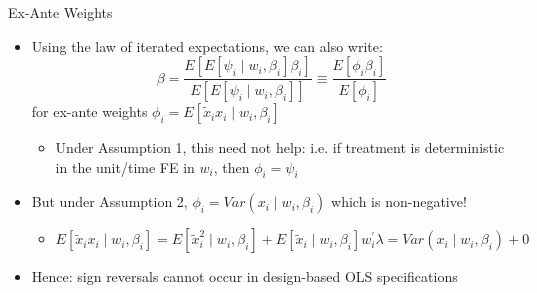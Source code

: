\documentclass[11pt,english]{beamer}
\begin{document}
\begin{frame}{Ex-Ante Weights}

\begin{itemize}
\item Using the law of iterated expectations, we can also write:
\begin{equation*}
\beta= \frac{E[E[\psi_i\mid w_i,\beta_i]\beta_i]}{E[E[\psi_i\mid w_i,\beta_i]]}\equiv \frac{E[\phi_i\beta_i]}{E[\phi_i]}
\end{equation*}
for ex-ante weights $\phi_i = E[\tilde{x}_ix_i\mid w_i,\beta_i]$
\pause{}\smallskip
\begin{itemize}
\item Under Assumption 1, this need not help: i.e. if treatment is deterministic in the unit/time FE in $w_i$, then $\phi_i=\psi_i$\pause{}
\end{itemize}\bigskip 

\item But under Assumption 2, $\phi_i=Var(x_i\mid w_i,\beta_i)$ which is non-negative!\smallskip\pause{}
\begin{itemize}
\item $E[\tilde{x}_ix_i\mid w_i,\beta_i]=E[\tilde{x}_i^2\mid w_i,\beta_i]+E[\tilde{x}_i\mid w_i,\beta_i]w_i^\prime\lambda=Var(x_i\mid w_i,\beta_i)+0$
\end{itemize}\bigskip\pause{}
\item Hence: sign reversals cannot occur in design-based OLS specifications
\end{itemize}
\end{frame}
\end{document}
